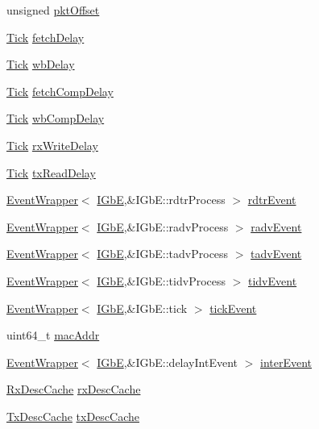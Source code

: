 \begin{DoxyCompactItemize}
\item 
unsigned \hyperlink{classIGbE_a41fd0002dbd12f7ab760e7f0a6620953}{pktOffset}
\item 
\hyperlink{base_2types_8hh_a5c8ed81b7d238c9083e1037ba6d61643}{Tick} \hyperlink{classIGbE_aa17c871ae2de13303ab07a8e8b571965}{fetchDelay}
\item 
\hyperlink{base_2types_8hh_a5c8ed81b7d238c9083e1037ba6d61643}{Tick} \hyperlink{classIGbE_a899afa4a59ed0cf8334061645dc16c53}{wbDelay}
\item 
\hyperlink{base_2types_8hh_a5c8ed81b7d238c9083e1037ba6d61643}{Tick} \hyperlink{classIGbE_ae404928093bd61ac24cd54406a98046e}{fetchCompDelay}
\item 
\hyperlink{base_2types_8hh_a5c8ed81b7d238c9083e1037ba6d61643}{Tick} \hyperlink{classIGbE_ab0f05d6ecbedd2a670abfe34bc8112e1}{wbCompDelay}
\item 
\hyperlink{base_2types_8hh_a5c8ed81b7d238c9083e1037ba6d61643}{Tick} \hyperlink{classIGbE_a94231b5b6ec824655f1e33a2481009fb}{rxWriteDelay}
\item 
\hyperlink{base_2types_8hh_a5c8ed81b7d238c9083e1037ba6d61643}{Tick} \hyperlink{classIGbE_a2e204efac3d8a0a09aef20570520baac}{txReadDelay}
\item 
\hyperlink{classEventWrapper}{EventWrapper}$<$ \hyperlink{classIGbE}{IGbE},\&IGbE::rdtrProcess $>$ \hyperlink{classIGbE_a72b4c60f46bdb4b88427dec167aaca80}{rdtrEvent}
\item 
\hyperlink{classEventWrapper}{EventWrapper}$<$ \hyperlink{classIGbE}{IGbE},\&IGbE::radvProcess $>$ \hyperlink{classIGbE_a30a3a2a8194ad851683c915beca8a172}{radvEvent}
\item 
\hyperlink{classEventWrapper}{EventWrapper}$<$ \hyperlink{classIGbE}{IGbE},\&IGbE::tadvProcess $>$ \hyperlink{classIGbE_a52af2948f0bdbd05624c9f1e90872556}{tadvEvent}
\item 
\hyperlink{classEventWrapper}{EventWrapper}$<$ \hyperlink{classIGbE}{IGbE},\&IGbE::tidvProcess $>$ \hyperlink{classIGbE_a91fce863693eb4c56a924639620d77cf}{tidvEvent}
\item 
\hyperlink{classEventWrapper}{EventWrapper}$<$ \hyperlink{classIGbE}{IGbE},\&IGbE::tick $>$ \hyperlink{classIGbE_a13b02e56360d63f349a514edb321bd9c}{tickEvent}
\item 
uint64\_\-t \hyperlink{classIGbE_ab70964077d0446a01beedcfb7b9f64da}{macAddr}
\item 
\hyperlink{classEventWrapper}{EventWrapper}$<$ \hyperlink{classIGbE}{IGbE},\&IGbE::delayIntEvent $>$ \hyperlink{classIGbE_a3de27cfe33d0ae9f9451c767ee40a57d}{interEvent}
\item 
\hyperlink{classIGbE_1_1RxDescCache}{RxDescCache} \hyperlink{classIGbE_a0e260069d3ff6994b7ab0d843388c5d5}{rxDescCache}
\item 
\hyperlink{classIGbE_1_1TxDescCache}{TxDescCache} \hyperlink{classIGbE_a8ab7bc15342abe2e4fe9d9bde951441b}{txDescCache}
\end{DoxyCompactItemize}
